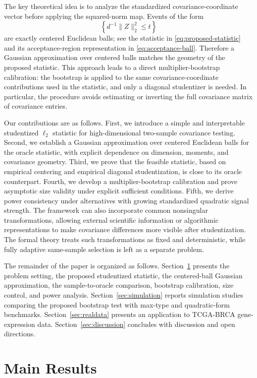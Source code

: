\documentclass[
  12pt]{article}
\theoremstyle{plain}
\theoremstyle{definition}
\theoremstyle{remark}
\begin{document}
The key theoretical idea is to analyze the standardized covariance-coordinate
vector before applying the squared-norm map.  Events of the form
\[
  \left\{ d^{-1}\|Z\|_2^2 \le t \right\}
\]
are exactly centered Euclidean balls; see the statistic in
\eqref{eq:proposed-statistic} and its acceptance-region representation in
\eqref{eq:acceptance-ball}.  Therefore a Gaussian approximation over centered
balls matches the geometry of the proposed statistic.  This approach leads to a
direct multiplier-bootstrap calibration: the bootstrap is applied to the same
covariance-coordinate contributions used in the statistic, and only a diagonal
studentizer is needed.  In particular, the procedure avoids estimating or
inverting the full covariance matrix of covariance entries.

Our contributions are as follows.  First, we introduce a simple and
interpretable studentized \(\ell_2\) statistic for high-dimensional two-sample
covariance testing.  Second, we establish a Gaussian approximation over
centered Euclidean balls for the oracle statistic, with explicit dependence on
dimension, moments, and covariance geometry.  Third, we prove that the feasible
statistic, based on empirical centering and empirical diagonal studentization,
is close to its oracle counterpart.  Fourth, we develop a multiplier-bootstrap
calibration and prove asymptotic size validity under explicit sufficient
conditions.  Fifth, we derive power consistency under alternatives with growing
standardized quadratic signal strength.  The framework can also incorporate
common nonsingular transformations, allowing external scientific information or
algorithmic representations to make covariance differences more visible after
studentization.  The formal theory treats such transformations as fixed and
deterministic, while fully adaptive same-sample selection is left as a separate
problem.

The remainder of the paper is organized as follows.
Section~\ref{sec:main_results} presents the problem setting, the proposed
studentized statistic, the centered-ball Gaussian approximation, the
sample-to-oracle comparison, bootstrap calibration, size control, and power
analysis.  Section~\ref{sec:simulation} reports simulation studies comparing
the proposed bootstrap test with max-type and quadratic-form benchmarks.
Section~\ref{sec:realdata} presents an application to TCGA-BRCA gene-expression
data.  Section~\ref{sec:discussion} concludes with discussion and open
directions.

\section{Main Results}
\label{sec:main_results}
\end{document}
